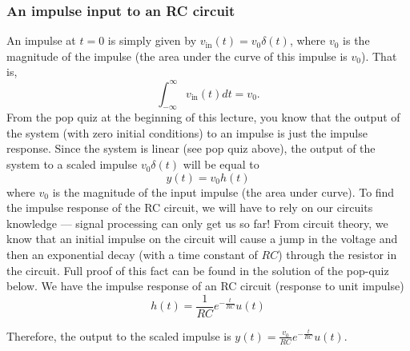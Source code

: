 \subsubsection{An impulse input to an RC circuit}
An impulse at $t = 0$ is simply given by $v_{\text{in}}(t) = v_0\delta(t)$, where $v_0$ is the magnitude of the impulse (the area under the curve of this impulse is $v_0$). That is, 
\[
\int_{-\infty}^{\infty} v_{\text{in}}(t) dt = v_0.
\]
From the pop quiz at the beginning of this lecture, you know that the output of the system (with zero initial conditions) to an impulse is just the impulse response. Since the system is linear (see pop quiz above), the output of the system to a scaled impulse $v_0\delta(t)$ will be equal to   
\[
y(t) = v_0 h(t)
\] 
where $v_0$ is the magnitude of the input impulse (the area under curve). To find the impulse response of the RC circuit, we will have to rely on our circuits knowledge --- signal processing can only get us so far! From circuit theory, we know that an initial impulse on the circuit will cause a jump in the voltage and then an exponential decay (with a time constant of $RC$) through the resistor in the circuit. Full proof of this fact can be found in the solution of the pop-quiz below. We have the impulse response of an RC circuit (response to unit impulse)
\begin{equation}
\label{eq:h-rc}
h(t) = \frac{1}{RC}e^{-\frac{t}{RC}}u(t)
\end{equation}

Therefore, the output to the scaled impulse is $y(t) = \frac{v_0}{RC} e^{-\frac{t}{RC}}u(t)$.

